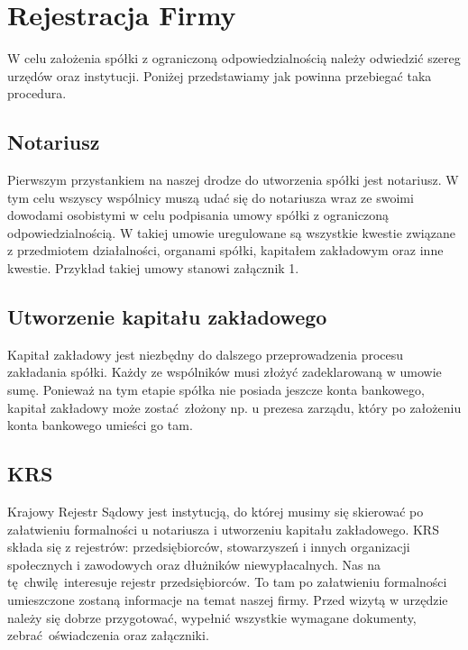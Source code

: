 \section{Rejestracja Firmy}

W celu założenia spółki z ograniczoną odpowiedzialnością należy odwiedzić szereg urzędów oraz instytucji. Poniżej przedstawiamy jak powinna przebiegać taka procedura.
\subsection{Notariusz}
Pierwszym przystankiem na naszej drodze do utworzenia spółki jest notariusz. W tym celu wszyscy wspólnicy muszą udać się do notariusza wraz ze swoimi dowodami osobistymi w celu podpisania umowy spółki z ograniczoną odpowiedzialnością. W takiej umowie uregulowane są wszystkie kwestie związane z przedmiotem działalności, organami spółki, kapitałem zakładowym oraz inne kwestie.  Przykład takiej umowy stanowi załącznik 1.

\subsection{Utworzenie kapitału zakładowego}
Kapitał zakładowy jest niezbędny do dalszego przeprowadzenia procesu zakładania spółki. Każdy ze wspólników musi złożyć zadeklarowaną w umowie sumę. Ponieważ na tym etapie spółka nie posiada jeszcze konta bankowego, kapitał zakładowy może zostać złożony np. u prezesa zarządu, który po założeniu konta bankowego umieści go tam.

\subsection{KRS}
Krajowy Rejestr Sądowy jest instytucją, do której musimy się skierować po załatwieniu formalności u notariusza i utworzeniu kapitału zakładowego. KRS składa się z rejestrów: przedsiębiorców, stowarzyszeń i innych organizacji społecznych i zawodowych oraz dłużników niewypłacalnych. Nas na tę chwilę interesuje rejestr przedsiębiorców. To tam po załatwieniu formalności umieszczone zostaną informacje na temat naszej firmy. Przed wizytą w urzędzie należy się dobrze przygotować, wypełnić wszystkie wymagane dokumenty, zebrać oświadczenia oraz załączniki. 

